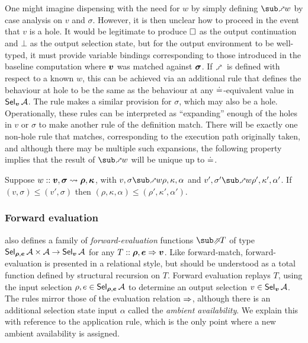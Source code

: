 One might imagine dispensing with the need for $w$ by simply defining $\matchFwdF{w}$ by case analysis on $v$ and $\sigma$. However, it is then unclear how to proceed in the event that $v$ is a hole. It would be legitimate to produce $\square$ as the output continuation and $\bot$ as the output selection state, but for the output environment to be well-typed, it must provide variable bindings corresponding to those introduced in the baseline computation where $\bm{v}$ was matched against $\bm{\sigma}$. If $\matchFwdS$ is defined with respect to a known $w$, this can be achieved via an additional rule  that defines the behaviour at hole to be the same as the behaviour at any $\doteq$-equivalent value in $\textup{\textsf{Sel}}_{\bm{v}}\,{\mathcal{A}}$. The  rule makes a similar provision for $\sigma$, which may also be a hole. Operationally, these rules can be interpreted as ``expanding'' enough of the holes in $v$ or $\sigma$ to make another rule of the definition match. There will be exactly one non-hole rule that matches, corresponding to the execution path originally taken, and although there may be multiple such expansions, the following property implies that the result of $\matchFwdF{w}$ will be unique up to $\doteq$.

\begin{lemma}
   Suppose $w :: \bm{v}, \bm{\sigma} \rightsquigarrow \bm{\rho}, \bm{\kappa}$, with $v, \sigma \matchFwdR{w} \rho, \kappa, \alpha$ and $v', \sigma' \matchFwdR{w} \rho', \kappa', \alpha'$. If $(v, \sigma) \leq (v', \sigma)$ then $(\rho, \kappa, \alpha) \leq (\rho', \kappa', \alpha')$.
\end{lemma}

\subsubsection{Forward evaluation}
\label{sec:data-dependencies:forward-eval}

 also defines a family of \emph{forward-evaluation} functions $\evalFwdF{T}$ of type $\textup{\textsf{Sel}}_{\bm{\rho}, \bm{e}}\,{\mathcal{A}} \times \mathcal{A} \to \textup{\textsf{Sel}}_{\bm{v}}\,{\mathcal{A}}$ for any $T :: \bm{\rho}, \bm{e} \Rightarrow \bm{v}$. Like forward-match, forward-evaluation is presented in a relational style, but should be understood as a total function defined by structural recursion on $T$. Forward evaluation replays $T$, using the input selection $\rho, e \in \textup{\textsf{Sel}}_{\bm{\rho}, \bm{e}}\,{\mathcal{A}}$ to determine an output selection $v \in \textup{\textsf{Sel}}_{\bm{v}}\,{\mathcal{A}}$. The rules mirror those of the evaluation relation $\Rightarrow$, although there is an additional selection state input $\alpha$ called the \emph{ambient availability}. We explain this with reference to the application rule, which is the only point where a new ambient availability is assigned.

